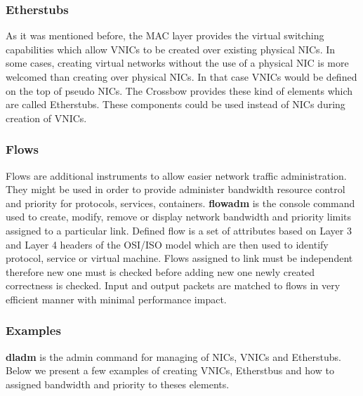 \documentclass[11pt]{book}
\begin{document}
			\subsubsection{Etherstubs}

                        As it was mentioned before, the MAC layer provides the virtual switching capabilities which allow VNICs to be created over existing physical NICs.
                        In some cases, creating virtual networks without the use of a physical NIC is more welcomed than creating over physical NICs. In that case VNICs 
                        would be defined on the top of pseudo NICs. The Crossbow provides these kind of elements which are called Etherstubs. These components could be used
                        instead of NICs during creation of VNICs.

                \subsubsection{Flows}

                        Flows are additional instruments to allow easier network traffic administration. They might be used in order to provide administer bandwidth resource control and priority for protocols, services, containers.
                        \textbf{flowadm} is the console command used to create, modify, remove or display network bandwidth and priority limits assigned to a particular link. 
                        Defined flow is a set of attributes based on Layer 3 and Layer 4 headers of the OSI/ISO model which are then used to identify protocol, service or virtual machine. 
                        Flows assigned to link must be independent therefore new one must is checked before adding new one newly created correctness is checked. Input and output packets are matched to flows in very efficient 
                        manner with minimal performance impact.


                \subsubsection{Examples}

                        \textbf{dladm} is the admin command for managing of NICs, VNICs and Etherstubs. Below we present a few examples of creating VNICs, Etherstbus and how
                        to assigned bandwidth and priority to theses elements.
\end{document}
